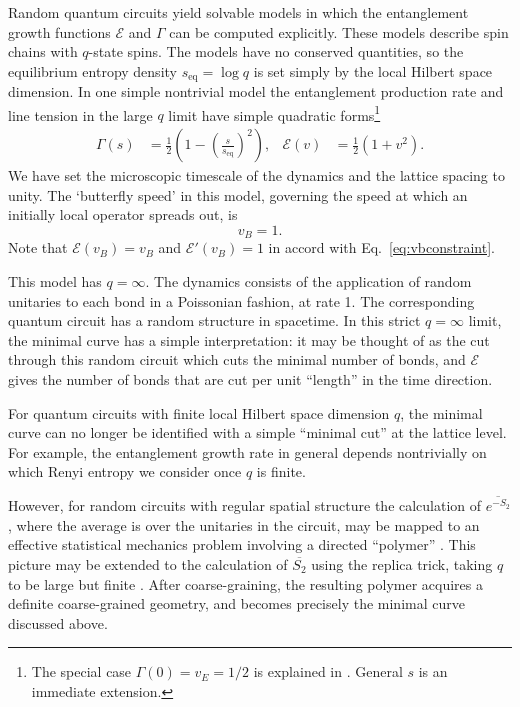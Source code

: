 \documentclass[aps,prx,twocolumn,superscriptaddress,floatfix,nofootinbib,prx]{revtex4}
\newcommand{\f}{\frac}
\renewcommand{\>}{\right\rangle}
\newcommand{\<}{\left\langle}
\newcommand{\ba}{\begin{align}}
\newcommand{\be}{\begin{equation}}
\newcommand{\ee}{\end{equation}}
\newcommand{\lf}{\left(}
\newcommand{\ri}{\right)}
\newcommand{\seq}{s_\text{eq}}
\newcommand{\lt}{\mathcal{E}}
\begin{document}
Random quantum circuits yield solvable models in which the entanglement growth functions $\lt$ and $\Gamma$ can be computed explicitly.\cite{nahum, nahum3, zhounahum} These models describe spin chains with $q$-state spins. The models have no conserved quantities, so the equilibrium entropy density $\seq = \log q$ is set simply by the local Hilbert space dimension.  In one simple nontrivial model\cite{nahum} the entanglement production rate and line tension in the large $q$ limit have simple quadratic forms\footnote{The special case $\Gamma(0) = v_E =1/2$ is explained in \cite{nahum}. General $s$ is an immediate extension.}
\ba\label{randomstructureexample}
\Gamma(s) & = \f{1}{2} \lf 1 - \lf \f{s}{\seq}\ri^2 \ri, &
\lt(v) & =  \f{1}{2} \lf 1 + v^2 \ri.
\end{align}
We  have set the microscopic timescale of the dynamics and the lattice spacing to unity. The  `butterfly speed' in this model, governing the speed at which an initially local operator spreads out, is 
\be
v_B=1.
\ee
Note that $\lt(v_B) = v_B$ and $\lt'(v_B) = 1$ in accord with Eq.~\ref{eq:vbconstraint}.

This model has $q=\infty$. The dynamics consists of the application of random unitaries to each bond in a Poissonian fashion, at rate 1.  The corresponding quantum circuit has a random structure in spacetime.  In this strict $q=\infty$ limit, the minimal curve has a simple interpretation: it may be thought of as the cut through this random circuit which cuts the minimal number of bonds, and $\lt$ gives the number of bonds that are cut per unit ``length'' in the time direction.

For quantum circuits with {finite} local Hilbert space dimension $q$, the minimal curve can no longer be identified with a simple ``minimal cut'' at the lattice level. For example, the entanglement growth rate in general depends nontrivially on which Renyi entropy we consider once $q$ is finite\cite{zhounahum,amosandreajohn}.  

However, for random circuits with regular spatial structure\cite{zhounahum, nahum3, keyserlingk} the calculation of $\overline{e^{-S_2}}$, where the average is over the unitaries in the circuit, may be mapped to an effective statistical mechanics problem involving a directed ``polymer'' \cite{nahum3}. 
This picture may be extended  to the calculation of $\overline{S_2}$ using the replica trick, taking $q$ to be large but finite \cite{zhounahum}. After coarse-graining, the resulting polymer acquires a definite coarse-grained geometry, and becomes precisely the minimal curve discussed above. 
\end{document}
